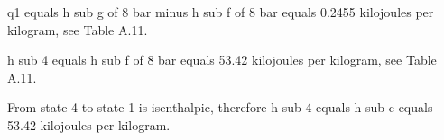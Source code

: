 q1 equals h sub g of 8 bar minus h sub f of 8 bar equals 0.2455 kilojoules per kilogram, see Table A.11.

h sub 4 equals h sub f of 8 bar equals 53.42 kilojoules per kilogram, see Table A.11.

From state 4 to state 1 is isenthalpic, therefore h sub 4 equals h sub c equals 53.42 kilojoules per kilogram.